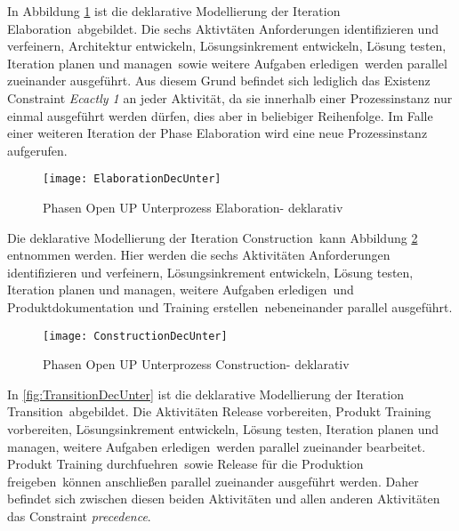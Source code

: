 In Abbildung \ref{fig:ElaborationDecUnter} ist die deklarative Modellierung der Iteration \grqq Elaboration\grqq \  abgebildet. Die sechs Aktivtäten \grqq Anforderungen identifizieren und verfeinern\grqq, \grqq Architektur entwickeln\grqq, \grqq Lösungsinkrement entwickeln\grqq, \grqq Lösung testen\grqq, \grqq Iteration planen und managen\grqq \ sowie \grqq weitere Aufgaben erledigen\grqq \ werden parallel zueinander ausgeführt. Aus diesem Grund befindet sich lediglich das Existenz Constraint \textit{Ecactly 1} an jeder Aktivität, da sie innerhalb einer Prozessinstanz nur einmal ausgeführt werden dürfen, dies aber in beliebiger Reihenfolge. Im Falle einer weiteren Iteration der Phase Elaboration wird eine neue Prozessinstanz aufgerufen. \newline

\begin{figure}[htp]
\begin{center}
  \texttt{[image: ElaborationDecUnter]} %
  \caption{Phasen Open UP Unterprozess Elaboration- deklarativ} 
  \label{fig:ElaborationDecUnter}
\end{center}
\end{figure}

Die deklarative Modellierung der Iteration \grqq Construction\grqq \  kann Abbildung \ref{fig:ConstructionDecUnter} entnommen werden. Hier werden die sechs Aktivitäten \grqq Anforderungen identifizieren und verfeinern\grqq, \grqq Lösungsinkrement entwickeln\grqq, \grqq Lösung testen\grqq, \grqq Iteration planen und managen\grqq, \grqq weitere Aufgaben erledigen\grqq \ und \grqq Produktdokumentation und Training erstellen\grqq \ nebeneinander parallel ausgeführt.
\begin{figure}[htp]
\begin{center}
  \texttt{[image: ConstructionDecUnter]} %
  \caption{Phasen Open UP Unterprozess Construction- deklarativ}
  \label{fig:ConstructionDecUnter}
\end{center}
\end{figure}

In \ref{fig:TransitionDecUnter} ist die deklarative Modellierung der Iteration \grqq Transition\grqq \  abgebildet.\newline
Die Aktivitäten \grqq Release vorbereiten, Produkt Training vorbereiten, Lösungsinkrement entwickeln, Lösung testen, Iteration planen und managen, weitere Aufgaben erledigen\grqq \ werden parallel zueinander bearbeitet. \grqq Produkt Training durchfuehren\grqq \   sowie \grqq Release für die Produktion freigeben\grqq \  können anschließen parallel zueinander ausgeführt werden. Daher befindet sich zwischen diesen beiden Aktivitäten und allen anderen Aktivitäten das Constraint \textit{precedence}.

